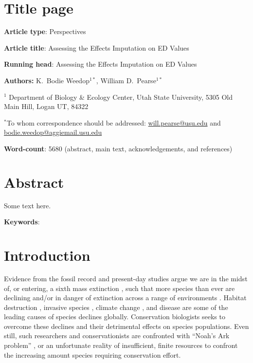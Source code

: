 \documentclass[12pt,english]{article}
\begin{document}
\setlength{\parindent}{0pt}
\section*{Title page}
\textbf{Article type}: Perspectives

\textbf{Article title}: Assessing the Effects Imputation on ED Values

\textbf{Running head}: Assessing the Effects Imputation on ED Values

\textbf{Authors:} K.\ Bodie Weedop$^{1*}$, William D.\ Pearse$^{1*}$\

$^1$ Department of Biology \& Ecology Center, Utah State University,
5305 Old Main Hill, Logan UT, 84322

$^*$To whom correspondence should be addressed:
\url{will.pearse@usu.edu} and \url{bodie.weedop@aggiemail.usu.edu}

\textbf{Word-count}: 5680 (abstract, main text, acknowledgements, and references)

\clearpage
\section*{Abstract}

Some text here.

\textbf{Keywords}: 

\clearpage
\section*{Introduction}
Evidence from the fossil record and present-day studies argue we are
in the midst of, or entering, a sixth mass extinction \autocite{Barnosky2011; Ceballos2015}, such that more species than ever are
declining and/or in danger of extinction across a range of
environments \autocite{Wake2008,Thomas2004}. Habitat destruction
\autocite{Brooks2002}, invasive species
\autocite{Molnar2008}, climate change
\autocite{Pounds2006}, and disease \autocite{Lips2006} are some of
the leading causes of species declines globally. Conservation
biologists seeks to overcome these declines and their detrimental
effects on species populations. Even still, such researchers and
conservationists are confronted with ``Noah's Ark problem''
\autocite{Weitzman1998}, or an unfortunate reality of insufficient,
finite resources to confront the increasing amount species requiring
conservation effort.
\end{document}
